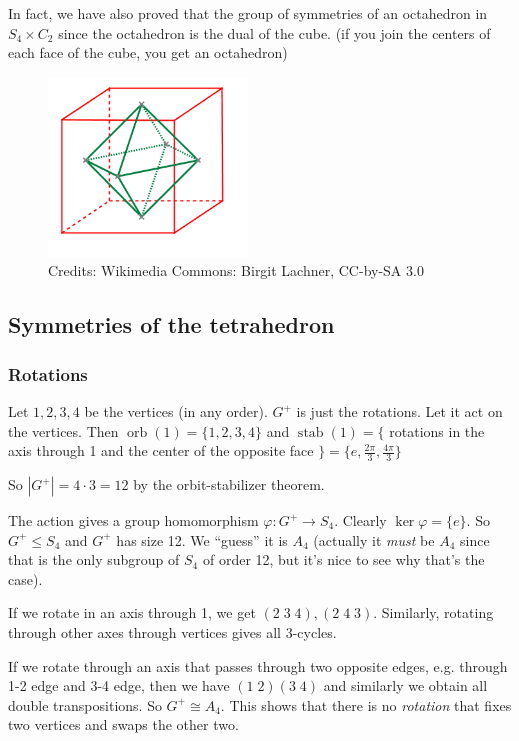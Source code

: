 \documentclass[a4paper]{article}
\theoremstyle{definition}
\DeclareMathOperator\orb{orb}
\DeclareMathOperator\stab{stab}
\begin{document}
In fact, we have also proved that the group of symmetries of an octahedron in $S_4\times C_2$ since the octahedron is the dual of the cube. (if you join the centers of each face of the cube, you get an octahedron)
\begin{figure}[ht]
  \centering
  \includegraphics[width=150pt]{images/grp_1.png}
  \caption*{Credits: Wikimedia Commons: Birgit Lachner, CC-by-SA 3.0}
\end{figure}

\subsection{Symmetries of the tetrahedron}
\subsubsection{Rotations}
Let $1, 2, 3, 4$ be the vertices (in any order). $G^+$ is just the rotations. Let it act on the vertices. Then $\orb(1) = \{1, 2, 3, 4\}$ and $\stab(1) = \{$ rotations in the axis through 1 and the center of the opposite face $\} = \{e, \frac{2\pi}{3}, \frac{4\pi}{3}\}$

So $|G^+| = 4\cdot 3 = 12$ by the orbit-stabilizer theorem.

The action gives a group homomorphism $\varphi: G^+ \to S_4$. Clearly $\ker \varphi = \{e\}$. So $G^+ \leq S_4$ and $G^+$ has size 12. We ``guess'' it is $A_4$ (actually it \emph{must} be $A_4$ since that is the only subgroup of $S_4$ of order 12, but it's nice to see why that's the case).

If we rotate in an axis through 1, we get $(2\; 3\; 4), (2\; 4\; 3)$. Similarly, rotating through other axes through vertices gives all 3-cycles. 

If we rotate through an axis that passes through two opposite edges, e.g. through 1-2 edge and 3-4 edge, then we have $(1\; 2)(3\; 4)$ and similarly we obtain all double transpositions. So $G^+ \cong A_4$. This shows that there is no \emph{rotation} that fixes two vertices and swaps the other two. 
\end{document}
